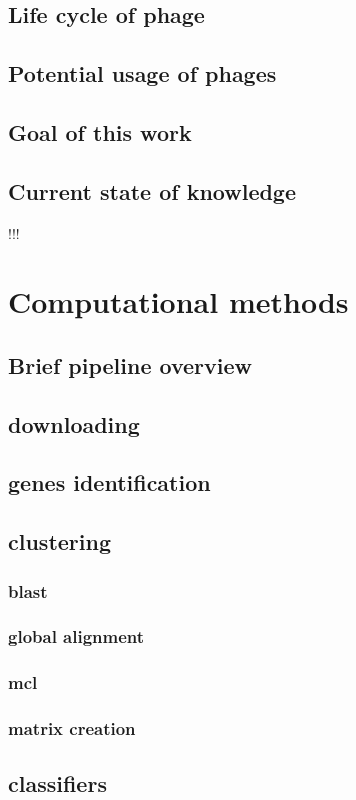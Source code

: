 \section{Life cycle of phage}
\section{Potential usage of phages}
\section{Goal of this work}
\section{Current state of knowledge} !!!


\chapter{Computational methods}
\section{Brief pipeline overview}
\section{downloading}
\section{genes identification}
\section{clustering}
\subsection{blast}
\subsection{global alignment}
\subsection{mcl}
\subsection{matrix creation}
\section{classifiers}
